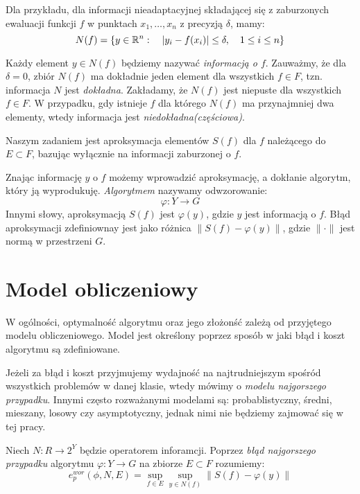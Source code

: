 \documentclass[oik, pdftex, robocza, man]{mgrwms}
\begin{document}
    Dla przykładu, dla informacji nieadaptacyjnej składającej się z zaburzonych ewaluacji funkcji $f$ w punktach $x_{1}, \dots, x_{n}$ z precyzją $\delta$, mamy:
    \begin{equation*}
        N(f) = \{y \in \mathbb{R}^{n} : \quad |y_{i} - f(x_{i})| \leq \delta, \quad 1 \leq i \leq n\}
    \end{equation*}
    
    Każdy element $y \in N(f)$ będziemy nazywać \textit{informacją o $f$}. Zauważmy, że dla $\delta = 0$, zbiór $N(f)$ ma dokładnie jeden element dla wszystkich $f \in F$, tzn. informacja $N$ jest \textit{dokładna}. Zakładamy, że $N(f)$ jest niepuste dla wszystkich $f \in F$. W przypadku, gdy istnieje $f$ dla którego $N(f)$ ma przynajmniej dwa elementy, wtedy informacja jest \textit{niedokładna(częściowa)}.

    Naszym zadaniem jest aproksymacja elementów $S(f)$ dla $f$ należącego do $E \subset F$, bazując wyłącznie na informacji zaburzonej o $f$. 

    Znając informację $y$ o $f$ możemy wprowadzić aproksymację, a dokłanie algorytm, który ją wyprodukuję. \textit{Algorytmem} nazywamy odwzorowanie:
    \begin{equation*}
        \varphi : Y \rightarrow G
    \end{equation*}
    Innymi słowy, aproksymacją $S(f)$ jest $\varphi(y)$, gdzie $y$ jest informacją o $f$. Błąd aproksymacji zdefiniownay jest jako różnica $\| S(f) - \varphi(y) \|$, gdzie $\|\cdot\|$ jest normą w przestrzeni $G$.


\section{Model obliczeniowy}


    W ogólności, optymalność algorytmu oraz jego złożonść zależą od przyjętego modelu obliczeniowego. Model jest określony poprzez sposób w jaki błąd i koszt algorytmu są zdefiniowane. 
    
    
    Jeżeli za błąd i koszt przyjmujemy wydajność na najtrudniejszym spośród wszystkich problemów w danej klasie, wtedy mówimy o \textit{modelu najgorszego przypadku}. Innymi często rozważanymi modelami są: probablistyczny, średni, mieszany, losowy czy asymptotyczny, jednak nimi nie będziemy zajmować się w tej pracy.

    Niech $N : R \rightarrow 2^{Y}$ będzie operatorem inforamcji. Poprzez \textit{błąd najgorszego przypadku} algorytmu $\varphi : Y \rightarrow G$ na zbiorze $E \subset F$ rozumiemy:
    \begin{equation*}
        e^{wor}_{p}(\phi, N, E) = \sup_{f \in E} \sup_{y \in N(f)} \|S(f) - \varphi(y) \|
    \end{equation*}
\end{document}
